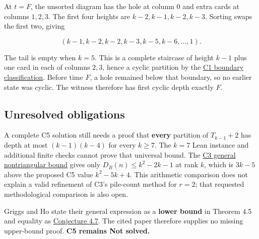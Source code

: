\documentclass[11pt,a4paper]{article}
\begin{document}
At \(t=F\), the unsorted diagram has the hole at column \(0\) and extra cards at columns \(1,2,3\). The first four heights are \(k-2,k-1,k-2,k-3\). Sorting swaps the first two, giving

\[
(k-1,k-2,k-2,k-3,k-5,k-6,\ldots,1).
\]

The tail is empty when \(k=5\). This is a complete staircase of height \(k-1\) plus one card in each of columns \(2,3\), hence a cyclic partition by the \href{https://github.com/mpelteshki/climbing-to-the-frontier/blob/212bba53b1818c08c40b8c4b48f636651eaf6410/cagent/p3/c1/written-proof.md}{C1 boundary classification}. Before time \(F\), a hole remained below that boundary, so no earlier state was cyclic. The witness therefore has first cyclic depth exactly \(F\).

\subsection{Unresolved obligations}\label{unresolved-obligations}

A complete C5 solution still needs a proof that \textbf{every} partition of \(T_{k-1}+2\) has depth at most \((k-1)(k-4)\) for every \(k\ge7\). The \(k=7\) Lean instance and additional finite checks cannot prove that universal bound. The \href{https://github.com/mpelteshki/climbing-to-the-frontier/blob/212bba53b1818c08c40b8c4b48f636651eaf6410/cagent/p3/c3/written-proof.md}{C3 general nontriangular bound} gives only \(D_B(n)\le k^2-2k-1\) at rank \(k\), which is \(3k-5\) above the proposed C5 value \(k^2-5k+4\). This arithmetic comparison does not explain a valid refinement of C3's pile-count method for \(r=2\); that requested methodological comparison is also open.

Griggs and Ho state their general expression as a \textbf{lower bound} in Theorem 4.5 and equality as \href{https://sc.edu/study/colleges_schools/artsandsciences/mathematics/research/imi/research/documents/1998/1998_12.pdf}{Conjecture 4.7}. The cited paper therefore supplies no missing upper-bound proof. \textbf{C5 remains Not solved.}
\end{document}

